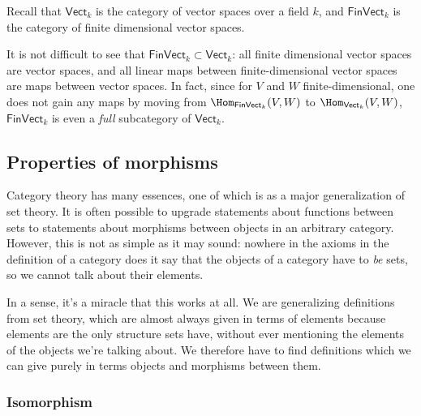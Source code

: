 \documentclass[notes.tex]{subfiles}
\begin{document}
\begin{example}
  \label{eg:finvectfullsubcategoryofvect}
  Recall that $\mathsf{Vect}_{k}$ is the category of vector spaces over a field $k$, and $\mathsf{FinVect}_{k}$ is the category of finite dimensional vector spaces.

  It is not difficult to see that $\mathsf{FinVect}_{k} \subset \mathsf{Vect}_{k}$: all finite dimensional vector spaces are vector spaces, and all linear maps between finite-dimensional vector spaces are maps between vector spaces. In fact, since for $V$ and $W$ finite-dimensional, one does not gain any maps by moving from $\Hom_{\mathsf{FinVect}_{k}}(V, W)$ to $\Hom_{\mathsf{Vect}_{k}}(V, W)$, $\mathsf{FinVect}_{k}$ is even a \emph{full\/} subcategory of $\mathsf{Vect}_{k}$.
\end{example}


\subsection{Properties of morphisms}

Category theory has many essences, one of which is as a major generalization of set theory. It is often possible to upgrade statements about functions between sets to statements about morphisms between objects in an arbitrary category. However, this is not as simple as it may sound: nowhere in the axioms in the definition of a category does it say that the objects of a category have to \emph{be\/} sets, so we cannot talk about their elements.

In a sense, it's a miracle that this works at all. We are generalizing definitions from set theory, which are almost always given in terms of elements because elements are the only structure sets have, without ever mentioning the elements of the objects we're talking about. We therefore have to find definitions which we can give purely in terms objects and morphisms between them.

\subsubsection{Isomorphism}
\end{document}
